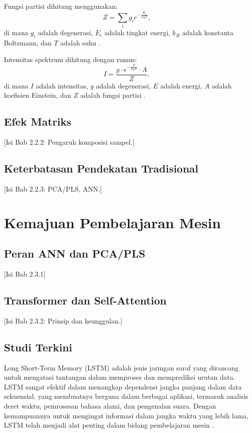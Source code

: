 Fungsi partisi dihitung menggunakan:
\begin{equation}
Z = \sum_{i} g_i e^{-\frac{E_i}{k_B T}},
\end{equation}
di mana $g_i$ adalah degenerasi, $E_i$ adalah tingkat energi, $k_B$ adalah konstanta Boltzmann, dan $T$ adalah suhu \cite{pathria2011}.

Intensitas spektrum dihitung dengan rumus:
\begin{equation}
I = \frac{g \cdot e^{-\frac{E}{k_B T}} \cdot A}{Z},
\end{equation}
di mana $I$ adalah intensitas, $g$ adalah degenerasi, $E$ adalah energi, $A$ adalah koefisien Einstein, dan $Z$ adalah fungsi partisi \cite{mason2015}.

\subsection{Efek Matriks}
[Isi Bab 2.2.2: Pengaruh komposisi sampel.]

\subsection{Keterbatasan Pendekatan Tradisional}
[Isi Bab 2.2.3: PCA/PLS, ANN.]

\section{Kemajuan Pembelajaran Mesin}
\subsection{Peran ANN dan PCA/PLS}
[Isi Bab 2.3.1]

\subsection{Transformer dan Self-Attention}
[Isi Bab 2.3.2: Prinsip dan keunggulan.]

\subsection{Studi Terkini}
Long Short-Term Memory (LSTM) adalah jenis jaringan saraf yang dirancang untuk mengatasi tantangan dalam memproses dan memprediksi urutan data. LSTM sangat efektif dalam menangkap dependensi jangka panjang dalam data sekuensial, yang membuatnya berguna dalam berbagai aplikasi, termasuk analisis deret waktu, pemrosesan bahasa alami, dan pengenalan suara. Dengan kemampuannya untuk mengingat informasi dalam jangka waktu yang lebih lama, LSTM telah menjadi alat penting dalam bidang pembelajaran mesin \cite{hochreiter1997}.

